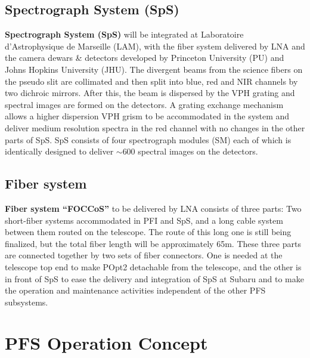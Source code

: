 \documentclass[a4paper]{article}
\begin{document}
\subsection{Spectrograph System (SpS)\label{sec:pfs_system:sps}}
{\bf Spectrograph System (SpS)} will be integrated at Laboratoire
d'Astrophysique de Marseille (LAM)\cite{madec16}, with the fiber
system delivered by LNA and the camera dewars \& detectors developed
by Princeton University (PU)\cite{gunn16} and Johns Hopkins University
(JHU)\cite{smee16, hart16}. The divergent beams from the science
fibers on the pseudo slit are collimated and then split into blue, red
and NIR channels by two dichroic mirrors. After this, the beam is
dispersed by the VPH grating and spectral images are formed on the
detectors. A grating exchange mechanism allows a higher dispersion VPH
grism to be accommodated in the system and deliver medium resolution
spectra in the red channel with no changes in the other parts of
SpS. SpS consists of four spectrograph modules (SM) each of which is
identically designed to deliver $\sim$600 spectral images on the
detectors.

\subsection{Fiber system\label{sec:pfs_system:fib}}
{\bf Fiber system ``FOCCoS''} to be delivered by LNA\cite{cesar14}
consists of three parts: Two short-fiber systems accommodated in PFI
and SpS, and a long cable system between them routed on the
telescope. The route of this long one is still being finalized, but
the total fiber length will be approximately 65m. These three parts
are connected together by two sets of fiber connectors. One is needed
at the telescope top end to make POpt2 detachable from the telescope,
and the other is in front of SpS to ease the delivery and integration
of SpS at Subaru and to make the operation and maintenance activities
independent of the other PFS subsystems.

\section{PFS Operation Concept\label{sec:operation_concept}}
\end{document}
